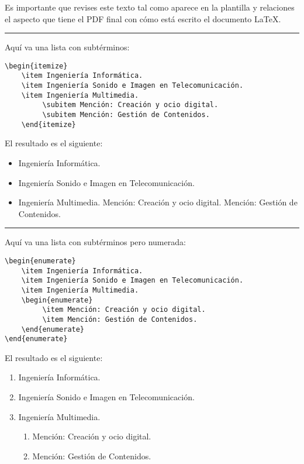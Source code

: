 Es importante que revises este texto tal como aparece en la plantilla y relaciones el aspecto que tiene el PDF final con cómo está escrito el documento \LaTeX.
\vspace{1em}
\noindent\hrule
\vspace{1em}

Aquí va una lista con subtérminos:
\begin{lstlisting}[style=Latex-color]
	\begin{itemize}
    \item Ingeniería Informática.
    \item Ingeniería Sonido e Imagen en Telecomunicación.
    \item Ingeniería Multimedia.
         \subitem Mención: Creación y ocio digital.
         \subitem Mención: Gestión de Contenidos.
	\end{itemize}
\end{lstlisting}

El resultado es el siguiente:
\begin{itemize}
    \item Ingeniería Informática.
    \item Ingeniería Sonido e Imagen en Telecomunicación.
    \item Ingeniería Multimedia.
         \subitem Mención: Creación y ocio digital.
         \subitem Mención: Gestión de Contenidos.
\end{itemize}
\vspace{1em}
\noindent\hrule
\vspace{1em}
Aquí va una lista con subtérminos pero numerada:
\begin{lstlisting}[style=Latex-color]
\begin{enumerate}
    \item Ingeniería Informática.
    \item Ingeniería Sonido e Imagen en Telecomunicación.
    \item Ingeniería Multimedia.
    \begin{enumerate}
         \item Mención: Creación y ocio digital.
         \item Mención: Gestión de Contenidos.
   	\end{enumerate}
\end{enumerate}
\end{lstlisting}

El resultado es el siguiente:
\begin{enumerate}
    \item Ingeniería Informática.
    \item Ingeniería Sonido e Imagen en Telecomunicación.
    \item Ingeniería Multimedia.
    \begin{enumerate}
         \item Mención: Creación y ocio digital.
         \item Mención: Gestión de Contenidos.
   	\end{enumerate}
\end{enumerate}

